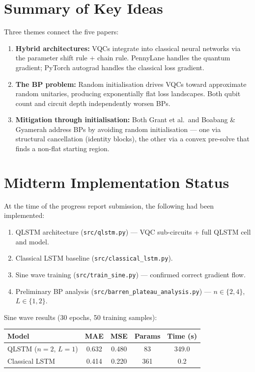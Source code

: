 \documentclass[11pt,a4paper]{article}
\begin{document}
\section{Summary of Key Ideas}

Three themes connect the five papers:
\begin{enumerate}
  \item \textbf{Hybrid architectures:} VQCs integrate into classical neural networks via the parameter shift rule + chain rule. PennyLane handles the quantum gradient; PyTorch autograd handles the classical loss gradient.
  \item \textbf{The BP problem:} Random initialisation drives VQCs toward approximate random unitaries, producing exponentially flat loss landscapes. Both qubit count and circuit depth independently worsen BPs.
  \item \textbf{Mitigation through initialisation:} Both Grant et al.\ and Boabang \& Gyamerah address BPs by avoiding random initialisation — one via structural cancellation (identity blocks), the other via a convex pre-solve that finds a non-flat starting region.
\end{enumerate}

\section{Midterm Implementation Status}

At the time of the progress report submission, the following had been implemented:

\begin{enumerate}
  \item QLSTM architecture (\texttt{src/qlstm.py}) — VQC sub-circuits + full QLSTM cell and model.
  \item Classical LSTM baseline (\texttt{src/classical\_lstm.py}).
  \item Sine wave training (\texttt{src/train\_sine.py}) — confirmed correct gradient flow.
  \item Preliminary BP analysis (\texttt{src/barren\_plateau\_analysis.py}) — $n \in \{2,4\}$, $L \in \{1,2\}$.
\end{enumerate}

Sine wave results (30 epochs, 50 training samples):

\begin{center}
\begin{tabular}{@{}lcccc@{}}
\toprule
\textbf{Model} & \textbf{MAE} & \textbf{MSE} & \textbf{Params} & \textbf{Time (s)} \\
\midrule
QLSTM ($n{=}2$, $L{=}1$) & 0.632 & 0.480 & 83 & 349.0 \\
Classical LSTM            & 0.414 & 0.220 & 361 & 0.2 \\
\bottomrule
\end{tabular}
\end{center}
\end{document}
